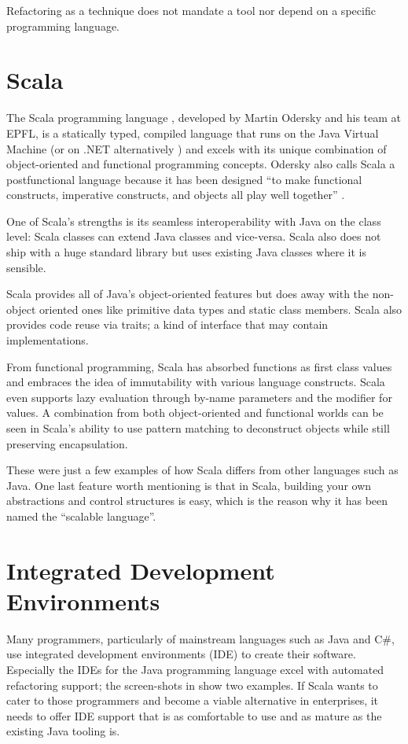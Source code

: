 \documentclass[10pt,a4paper,oneside]{scrreprt}
\begin{document}
Refactoring as a technique does not mandate a tool nor depend on a specific programming language.

\section{Scala}

The Scala programming language \cite{ProgrammingScala}, developed by Martin Odersky and his team at EPFL, is a statically typed, compiled language that runs on the Java Virtual Machine (or on .NET alternatively \cite{ScalacNet}) and excels with its unique combination of object-oriented and functional programming concepts. Odersky also calls Scala a postfunctional language because it has been designed ``to make functional constructs, imperative constructs, and objects all play well together'' \cite{ScalaPostFunctional}. 

One of Scala's strengths is its seamless interoperability with Java on the class level: Scala classes can extend Java classes and vice-versa. Scala also does not ship with a huge standard library but uses existing Java classes where it is sensible.

Scala provides all of Java's object-oriented features but does away with the non-object oriented ones like primitive data types and static class members. Scala also provides code reuse via traits; a kind of interface that may contain implementations.

From functional programming, Scala has absorbed functions as first class values and embraces the idea of immutability with various language constructs. Scala even supports lazy evaluation through by-name parameters and the  modifier for values. A combination from both object-oriented and functional worlds can be seen in Scala's ability to use pattern matching to deconstruct objects while still preserving encapsulation.

These were just a few examples of how Scala differs from other languages such as Java. One last feature worth mentioning is that in Scala, building your own abstractions and control structures is easy, which is the reason why it has been named the ``scalable language''.

\section{Integrated Development Environments}

Many programmers, particularly of mainstream languages such as Java and C\#, use integrated development environments (IDE) to create their software. Especially the IDEs for the Java programming language excel with automated refactoring support; the screen-shots in  show two examples. If Scala wants to cater to those programmers and become a viable alternative in enterprises, it needs to offer IDE support that is as comfortable to use and as mature as the existing Java tooling is.
\end{document}
